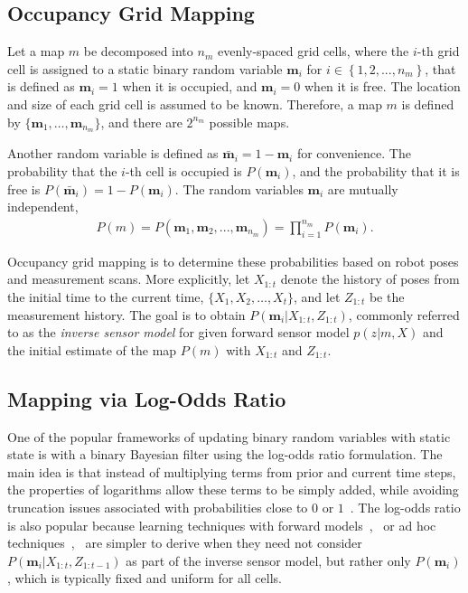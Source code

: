 \documentclass[letterpaper, 10pt, conference]{ieeeconf}
\newcommand{\braces}[1]{\ensuremath{\left\{ #1 \right\}}}
\begin{document}
	
\subsection{Occupancy Grid Mapping}

Let a map $m$ be decomposed into $n_m$ evenly-spaced grid cells, where the $i$-th grid cell is assigned to a static binary random variable $\mathbf{m}_i$ for $i\in\braces{1,2,...,n_m}$, that is defined as $\mathbf{m}_i=1$ when it is occupied, and $\mathbf{m}_i=0$ when it is free. The location and size of each grid cell is assumed to be known. Therefore, a map $m$ is defined by $\{\mathbf{m}_1,\ldots, \mathbf{m}_{n_m}\}$, and there are $2^{n_{m}}$ possible maps. 

Another random variable is defined as $\bar{\mathbf{m}}_i=1-\mathbf{m}_i$ for convenience. The probability that the $i$-th cell is occupied is $P(\mathbf{m}_i)$, and the probability that it is free is $P(\bar{\mathbf{m}}_i)=1-P(\mathbf{m}_i)$. The random variables $\mathbf{m}_i$ are mutually independent, 
\begin{align}
P(m)=P(\mathbf{m}_1,\mathbf{m}_2,...,\mathbf{m}_{n_m})=\prod_{i=1}^{n_m}P(\mathbf{m}_i).
\end{align}

Occupancy grid mapping  is to determine these probabilities based on robot poses and measurement scans. More explicitly, let $X_{1:t}$ denote the history of poses from the initial time to the current time, $\{X_1,X_2,\ldots, X_t\}$, and let $Z_{1:t}$ be the measurement history. The goal is to obtain $P(\mathbf{m}_i|X_{1:t},Z_{1:t})$, commonly referred to as the \emph{inverse sensor model} for given forward sensor model $p(z|m,X)$ and the initial estimate of the map $P(m)$ with $X_{1:t}$ and $Z_{1:t}$.

	
\subsection{Mapping via Log-Odds Ratio}

One of the popular frameworks of updating binary random variables with static state is with a binary Bayesian filter using the log-odds ratio formulation.
The main idea is that instead of multiplying terms from prior and current time steps, the properties of logarithms allow these terms to be simply added, while avoiding truncation issues associated with probabilities close to $0$ or $1$~\cite{ThrBurFox05}.
The log-odds ratio is also popular because learning techniques with forward models~\cite{Thr01},~\cite{Thr03} or ad hoc techniques~\cite{MorElf85},~\cite{Elf89} are simpler to derive when they need not consider $P(\mathbf{m}_i|X_{1:t},Z_{1:t-1})$ as part of the inverse sensor model, but rather only $P(\mathbf{m}_i)$, which is typically fixed and uniform for all cells.
\end{document}
